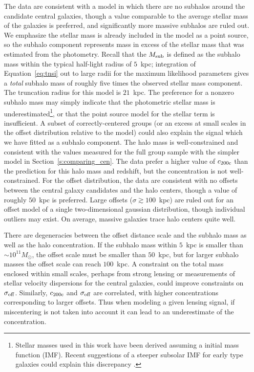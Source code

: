 \documentclass[12pt]{emulateapj}
\begin{document}
The data are
consistent with a model in which there are no subhalos around the
candidate central galaxies, though a value comparable to the average
stellar mass of the galaxies is preferred, and significantly more
massive subhalos are ruled out. We emphasize the stellar mass is
already included in the model as a point source, so the subhalo
component represents mass in excess of the stellar mass that was estimated from
the photometry. Recall that the $M_{\rm sub}$ is
defined as the subhalo mass within the typical half-light radius of
$5$~{\rm kpc}; integration of Equation~\eqref{eq:tnsi} out to large
radii for the maximum likelihood parameters gives a \textit{total}
subhalo mass of roughly five times the observed stellar mass component. The
truncation radius for this model is $21$~{\rm kpc}.  The preference for a nonzero subhalo
mass may simply indicate that the photometric stellar mass is
underestimated\footnote{Stellar masses used in this work have been
  derived assuming a \citet{Chabrier2003} initial mass function
  (IMF). Recent suggestions of a steeper subsolar IMF for early type galaxies
  could explain this discrepancy
  \citep[e.g.,][]{Auger2010,vanDokkum2010}.}, or that the point source
model for the stellar term is insufficient. A subset of
  correctly-centered groups (or an excess at small scales in the offset
  distribution relative to the model) could also explain the signal which we have fitted as a
  subhalo component. The halo mass is
well-constrained and consistent with the values measured for the full
group sample with the simpler model in Section~\ref{s:comparing_cen}.
The data prefer a higher
value of $c_{\rm 200c}$ than the \citet{Zhao2009} prediction for this
halo mass and redshift, but the concentration is not
well-constrained. For the offset distribution, the data are consistent
with no offsets between the central galaxy candidates and the halo
centers, though a value of roughly $50$~{\rm kpc} is preferred. Large
offsets ($\sigma\gtrsim100$~{\rm kpc}) are ruled out for an offset
model of a single two-dimensional gaussian distribution, though
individual outliers may exist. On average, massive galaxies trace halo
centers quite well.

There are degeneracies between the offset distance scale and the
subhalo mass as well as the halo concentration. If the subhalo mass
within $5$~{\rm kpc} is smaller than $\sim10^{11} M_{\odot}$, the
offset scale must be smaller than $50$~{\rm kpc}, but for larger
subhalo masses the offset scale can reach $100$~{\rm kpc}. A
constraint on the total mass enclosed within small scales, perhaps
from strong lensing or measurements of stellar velocity dispersions
for the central galaxies, could improve constraints on $\sigma_{\rm
  off}$. Similarly, $c_{\rm 200c}$ and $\sigma_{\rm off}$ are
correlated, with higher concentrations corresponding to larger
offsets. Thus when modeling a given lensing signal, if miscentering is
not taken into account it can lead to an underestimate of the
concentration.
\end{document}
